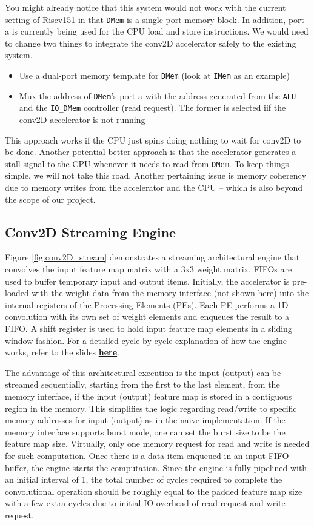 \documentclass[11pt]{article}
\begin{document}
You might already notice that this system would not work with the current setting of Riscv151 in that \texttt{DMem} is a single-port memory block. In addition, port a is currently being used for the CPU load and store instructions. We would need to change two things to integrate the conv2D accelerator safely to the existing system.

\begin{itemize}
\item Use a dual-port memory template for \texttt{DMem} (look at \texttt{IMem} as an example)
\item Mux the address of \texttt{DMem}'s port a with the address generated from the \texttt{ALU} and the \texttt{IO\_DMem} controller (read request). The former is selected iif the conv2D accelerator is not running
\end{itemize}

This approach works if the CPU just spins doing nothing to wait for conv2D to be done. Another potential better approach is that the accelerator generates a stall signal to the CPU whenever it needs to read from \texttt{DMem}. To keep things simple, we will not take this road. Another pertaining issue is memory coherency due to memory writes from the accelerator and the CPU -- which is also beyond the scope of our project.

\subsection{Conv2D Streaming Engine}

Figure \ref{fig:conv2D_stream} demonstrates a streaming architectural engine that convolves the input feature map matrix with a 3x3 weight matrix. FIFOs are used to buffer temporary input and output items. Initially, the accelerator is pre-loaded with the weight data from the memory interface (not shown here) into the internal registers of the Processing Elements (PEs). Each PE performs a 1D convolution with its own set of weight elements and enqueues the result to a FIFO. A shift register is used to hold input feature map elements in a sliding window fashion. For a detailed cycle-by-cycle explanation of how the engine works, refer to the slides \href{https://drive.google.com/file/d/1QGFzt3gZ53IK1ZCIaJ57NUKucU77Nwd-}{\textbf{here}}.

The advantage of this architectural execution is the input (output) can be streamed sequentially, starting from the first to the last element, from the memory interface, if the input (output) feature map is stored in a contiguous region in the memory. This simplifies the logic regarding read/write to specific memory addresses for input (output) as in the naive implementation. If the memory interface supports burst mode, one can set the burst size to be the feature map size. Virtually, only one memory request for read and write is needed for such computation. Once there is a data item enqueued in an input FIFO buffer, the engine starts the computation. Since the engine is fully pipelined with an initial interval of 1, the total number of cycles required to complete the convolutional operation should be roughly equal to the padded feature map size with a few extra cycles due to initial IO overhead of read request and write request.
\end{document}
